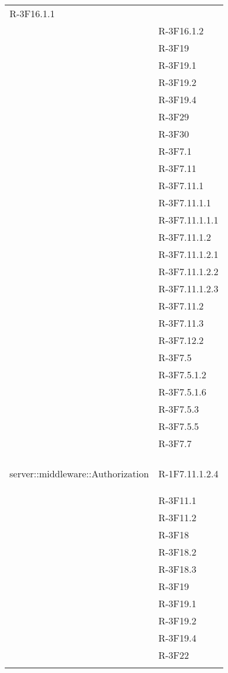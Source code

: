 \begin{longtable}{l p{3cm}}
R-3F16.1.1 \tabularnewline &

R-3F16.1.2 \tabularnewline &

R-3F19 \tabularnewline &

R-3F19.1 \tabularnewline &

R-3F19.2 \tabularnewline &

R-3F19.4 \tabularnewline &

R-3F29 \tabularnewline &

R-3F30 \tabularnewline &

R-3F7.1 \tabularnewline &

R-3F7.11 \tabularnewline &

R-3F7.11.1 \tabularnewline &

R-3F7.11.1.1 \tabularnewline &

R-3F7.11.1.1.1 \tabularnewline &

R-3F7.11.1.2 \tabularnewline &

R-3F7.11.1.2.1 \tabularnewline &

R-3F7.11.1.2.2 \tabularnewline &

R-3F7.11.1.2.3 \tabularnewline &

R-3F7.11.2 \tabularnewline &

R-3F7.11.3 \tabularnewline &

R-3F7.12.2 \tabularnewline &

R-3F7.5 \tabularnewline &

R-3F7.5.1.2 \tabularnewline &

R-3F7.5.1.6 \tabularnewline &

R-3F7.5.3 \tabularnewline &

R-3F7.5.5 \tabularnewline &

R-3F7.7 \tabularnewline &\tabularnewline
\midrule
\hypertarget{server::middleware::Authorization}{server::middleware::Authorization} & R-1F7.11.1.2.4 \tabularnewline &

R-3F11.1 \tabularnewline &

R-3F11.2 \tabularnewline &

R-3F18 \tabularnewline &

R-3F18.2 \tabularnewline &

R-3F18.3 \tabularnewline &

R-3F19 \tabularnewline &

R-3F19.1 \tabularnewline &

R-3F19.2 \tabularnewline &

R-3F19.4 \tabularnewline &

R-3F22 \tabularnewline &


\end{longtable}
